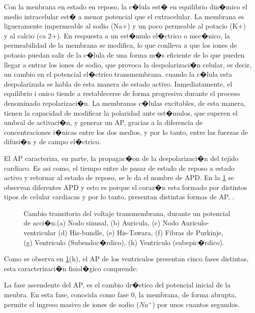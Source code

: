 Con la menbrana en estado en reposo, la c�lula est� en equilibrio din�mico el
medio intracelular est� a menor potencial que el extracelular. La membrana es
 ligueramente impermeable al sodio (Na+) y un poco permeable al potacio  (K+) y
 al calcio (ca 2+). En respuesta a un est�mulo el�ctrico o mec�nico, la
 permeabilidad de la membrana se modifica, lo que conlleva a que los iones de
 potasio puedan salir de la c�lula de una forma m�s eficiente de lo que pueden
 llegar a entrar los iones de sodio, que provoca la despolarizaci�n celular, es
 decir, un cambio en el potencial el�ctrico transmembrana. cuando la c�lula esta
 despolarizada se habla de esta manera de estado activo. Inmediatamente, el
 equilibrio i onico tiende a restablecerse de forma progresiva durante el
 proceso denominado repolarizaci�n.
 La membranas c�lulas excitables, de esta manera, tienen la capacidad de  
 modificar la polaridad ante est�mulos, que superen el umbral de activaci�n, y
 generar un \ac{AP}, gracias a la diferencia de concentraciones i�nicas entre
 los dos medios, y por lo tanto, entre las fuerzas de difusi�n  y de campo el�ctrico.
 
El \ac{AP} caracteriza, en parte, la propagac�on de la despolarizaci�n del
tejido cardiaco. Es asi como, el tiempo entre de pasar de estado de reposo a
estado activo  y retornar al estado de reposo, se le da el nombre de
\ac{APD}. En  la \ref{fig:apds} se observan diferentes \ac{APD} y esto es porque
el coraz�n esta formado por distintos tipos de celular cardiacas y por lo
tanto, presentan distintas formas de \ac{AP}, \cite{dawodu1996, Malmivuo95,
Sachse04}.



\begin{figure}[t]
\centering
\caption{Cambio transitorio del voltaje transmembrana, durante un potencial de
acci�n:(a) Nodo sinusal, (b) Auricula, (c) Nodo Auriculo-ventricular (d)
His-bundle,  (e) His-Tawara, (f) Fibras de Purkinje, (g)
Ventriculo (Subendoc�rdico), (h) Ventriculo (subepic�rdico). }
  \label{fig:apds}
\end{figure}


Como se observa en \ref{fig:apds}(h), el \ac{AP} de los ventriculos  presentan
cinco fases distintas, esta caracterizaci�n fisiol�gico comprende:

La fase ascendente del \ac{AP}, es el cambio dr�stico del potencial inicial de
la menbra. En esta fase, conocida como fase 0, la membrana,  de forma
abrupta, permite el ingreso masivo de iones de sodio ($Na^+$) por unos cuantos
segundos.

